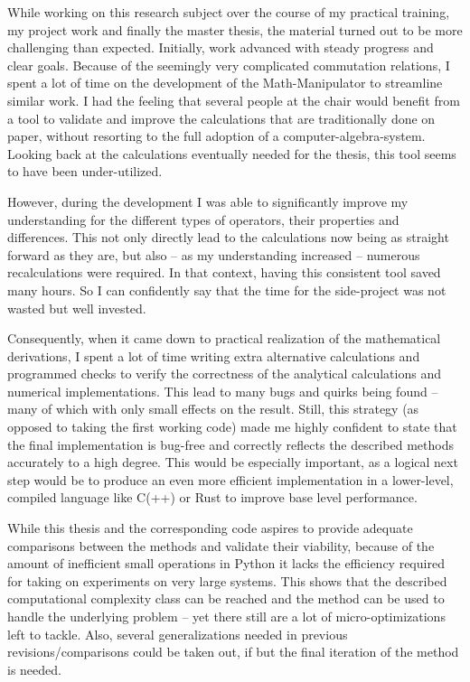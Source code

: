 While working on this research subject over the course of my practical training, my project work and finally the master thesis, the material turned out to be more challenging than expected.
Initially, work advanced with steady progress and clear goals.
Because of the seemingly very complicated commutation relations, I spent a lot of time on the development of the Math-Manipulator to streamline similar work.
I had the feeling that several people at the chair would benefit from a tool to validate and improve the calculations that are traditionally done on paper, without resorting to the full adoption of a computer-algebra-system.
Looking back at the calculations eventually needed for the thesis, this tool seems to have been under-utilized.

However, during the development I was able to significantly improve my understanding for the different types of operators, their properties and differences.
This not only directly lead to the calculations now being as straight forward as they are, but also -- as my understanding increased -- numerous recalculations were required.
In that context, having this consistent tool saved many hours.
So I can confidently say that the time for the side-project was not wasted but well invested.

Consequently, when it came down to practical realization of the mathematical derivations, I spent a lot of time writing extra alternative calculations and programmed checks to verify the correctness of the analytical calculations and numerical implementations.
This lead to many bugs and quirks being found -- many of which with only small effects on the result. 
Still, this strategy (as opposed to taking the first \glqq working\grqq{} code) made me highly confident to state that the final implementation is bug-free and correctly reflects the described methods accurately to a high degree.
This would be especially important, as a logical next step would be to produce an even more efficient implementation in a lower-level, compiled language like C(++) or Rust to improve base level performance.

While this thesis and the corresponding code aspires to provide adequate comparisons between the methods and validate their viability, because of the amount of inefficient small operations in Python it lacks the efficiency required for taking on experiments on very large systems.
This shows that the described computational complexity class can be reached and the method can be used to handle the underlying problem -- yet there still are a lot of micro-optimizations left to tackle.
Also, several generalizations needed in previous revisions/comparisons could be taken out, if but the final iteration of the method is needed.

